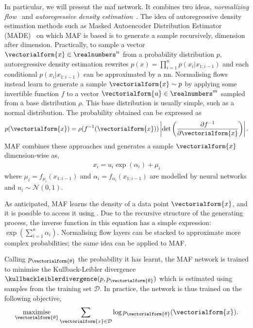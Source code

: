 In particular, we will present the \gls{maf} \cite{papamakarios2017masked} network. It combines two ideas,  \emph{normalizing flow}~\cite{rezende2015variational} and \emph{autoregressive density estimation}~\cite{uria2016neural}.
The idea of autoregressive density estimation methods such as Masked Autoencoder Distribution Estimator (MADE)~\cite{germain2015made} on which MAF is based is to generate a sample recursively, dimension after dimension. 
Practically, to sample a vector $\vectorialform{x}\in\realnumbers^n$ from a probability distribution $p$, autoregressive density estimation rewrites $\textstyle p(x)=\prod\nolimits_{i=1}^{n}p(x_i\vert x_{1:i-1})$ and each conditional $p(x_i\vert x_{1:i-1})$ can be approximated by a \gls{nn}.
Normalising flows instead learn to generate a sample $\vectorialform{x}\sim p$ by applying some invertible function $f$ to a vector $\vectorialform{u}\in\realnumbers^m$ sampled from a base distribution $\rho$. 
This base distribution is usually simple, such as a normal distribution.
The probability obtained can be expressed as
\begin{align}
\label{eq:p_inverted_maf}
    p(\vectorialform{x}) = \rho(f^{-1}(\vectorialform{x})) \left\lvert \det\left(\frac{\partial f^{-1}}{\partial \vectorialform{x}}\right)\right\rvert.
\end{align}
MAF combines these approaches and generates a sample $\vectorialform{x}$ dimension-wise as,
\begin{align}
\label{eq:sampling_maf}
    x_i = u_i \exp(\alpha_i) + \mu_i 
\end{align}
where $\mu_i=f_{\mu_i}(x_{1:i-1})$ and $\alpha_i=f_{\alpha_i}(x_{1:i-1})$ are modelled by neural networks and $u_i\sim\mathcal{N}(0,1)$.

As anticipated, MAF learns the density of a data point $\vectorialform{x}$, and it is possible to access it using . 
Due to the recursive structure of the generating process, the inverse function in this equation has a simple expression: $\textstyle\exp\left(\sum\nolimits_{i=1}^n\alpha_i\right)$\cite{papamakarios2017masked}.
Normalising flow layers can be stacked to approximate more complex probabilities; the same idea can be applied to MAF.

Calling $p_{\vectorialform{\theta}}$ the probability it has learnt, the MAF network is trained to minimise the Kullback-Leibler divergence $\kullbackleiblerdivergence(p,p_{\vectorialform{\theta}})$ which is estimated using samples from the training set $\mathcal{D}$. 
In practice, the network is thus trained on the following objective,
\begin{align*}
    \underset{\vectorialform{\theta}}{\text{maximise}}   \sum_{\vectorialform{x}\in\mathcal{D}}\log p_{\vectorialform{\theta}} (\vectorialform{x}).
\end{align*}